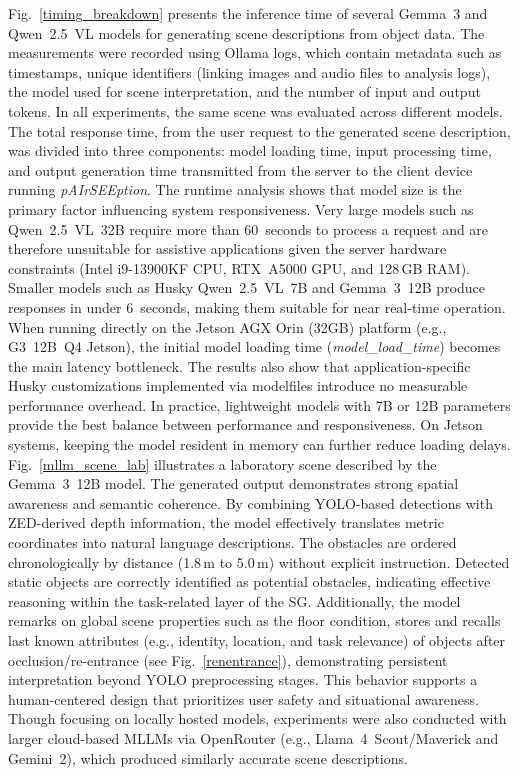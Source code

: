 \documentclass[lettersize,journal]{IEEEtran}
\begin{document}
Fig.~\ref{timing_breakdown} presents the inference time of several Gemma~3 and Qwen~2.5~VL models for generating scene descriptions from object data. The measurements were recorded using Ollama logs, which contain metadata such as timestamps, unique identifiers (linking images and audio files to analysis logs), the model used for scene interpretation, and the number of input and output tokens. In all experiments, the same scene was evaluated across different models. The total response time, from the user request to the generated scene description, was divided into three components: model loading time, input processing time, and output generation time transmitted from the server to the client device running \textit{pAIrSEEption}. The runtime analysis shows that model size is the primary factor influencing system responsiveness. Very large models such as Qwen~2.5~VL~32B require more than 60~seconds to process a request and are therefore unsuitable for assistive applications given the server hardware constraints (Intel i9-13900KF CPU, RTX~A5000 GPU, and 128\,GB RAM). Smaller models such as Husky Qwen~2.5~VL~7B and Gemma~3~12B produce responses in under 6~seconds, making them suitable for near real-time operation. When running directly on the Jetson AGX Orin (32GB) platform (e.g., G3~12B~Q4 Jetson), the initial model loading time (\textit{model\_load\_time}) becomes the main latency bottleneck. The results also show that application-specific Husky customizations implemented via modelfiles introduce no measurable performance overhead. In practice, lightweight models with 7B or 12B parameters provide the best balance between performance and responsiveness. On Jetson systems, keeping the model resident in memory can further reduce loading delays. Fig.~\ref{mllm_scene_lab} illustrates a laboratory scene described by the Gemma~3~12B model. The generated output demonstrates strong spatial awareness and semantic coherence. By combining YOLO-based detections with ZED-derived depth information, the model effectively translates metric coordinates into natural language descriptions. The obstacles are ordered chronologically by distance (1.8\,m to 5.0\,m) without explicit instruction. Detected static objects are correctly identified as potential obstacles, indicating effective reasoning within the task-related layer of the SG. Additionally, the model remarks on global scene properties such as the floor condition,  stores and recalls last known attributes (e.g., identity, location, and task relevance) of objects  after occlusion/re-entrance (see Fig.~\ref{renentrance}), demonstrating persistent interpretation  beyond  YOLO preprocessing stages. This behavior supports a human-centered design that prioritizes user safety and situational awareness. Though focusing on locally hosted models,  experiments were also conducted with larger cloud-based MLLMs via OpenRouter (e.g., Llama~4~Scout/Maverick and Gemini~2), which produced similarly accurate scene descriptions.
\end{document}

